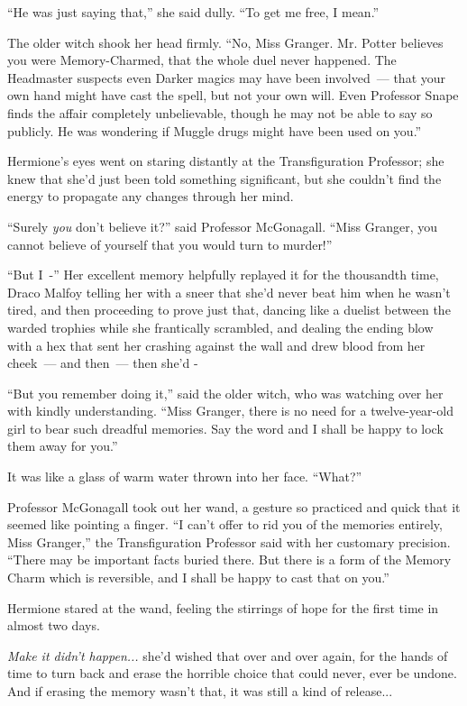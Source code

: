 ``He was just saying that,'' she said dully. ``To get me free, I mean.''

The older witch shook her head firmly. ``No, Miss Granger. Mr. Potter believes you were Memory-Charmed, that the whole duel never happened. The Headmaster suspects even Darker magics may have been involved~--- that your own hand might have cast the spell, but not your own will. Even Professor Snape finds the affair completely unbelievable, though he may not be able to say so publicly. He was wondering if Muggle drugs might have been used on you.''

Hermione's eyes went on staring distantly at the Transfiguration Professor; she knew that she'd just been told something significant, but she couldn't find the energy to propagate any changes through her mind.

``Surely \emph{you} don't believe it?'' said Professor McGonagall. ``Miss Granger, you cannot believe of yourself that you would turn to murder!''

``But I~-'' Her excellent memory helpfully replayed it for the thousandth time, Draco Malfoy telling her with a sneer that she'd never beat him when he wasn't tired, and then proceeding to prove just that, dancing like a duelist between the warded trophies while she frantically scrambled, and dealing the ending blow with a hex that sent her crashing against the wall and drew blood from her cheek~--- and then~--- then she'd -

``But you remember doing it,'' said the older witch, who was watching over her with kindly understanding. ``Miss Granger, there is no need for a twelve-year-old girl to bear such dreadful memories. Say the word and I shall be happy to lock them away for you.''

It was like a glass of warm water thrown into her face. ``What?''

Professor McGonagall took out her wand, a gesture so practiced and quick that it seemed like pointing a finger. ``I can't offer to rid you of the memories entirely, Miss Granger,'' the Transfiguration Professor said with her customary precision. ``There may be important facts buried there. But there is a form of the Memory Charm which is reversible, and I shall be happy to cast that on you.''

Hermione stared at the wand, feeling the stirrings of hope for the first time in almost two days.

\emph{Make it didn't happen...} she'd wished that over and over again, for the hands of time to turn back and erase the horrible choice that could never, ever be undone. And if erasing the memory wasn't that, it was still a kind of release...

